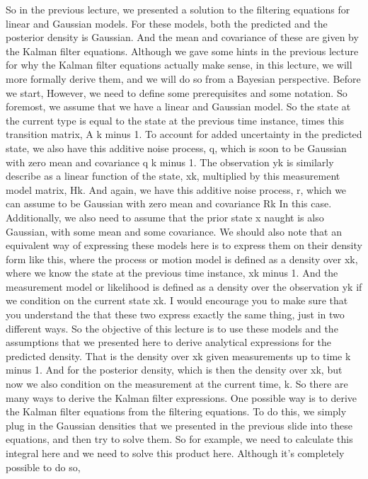 So in the previous lecture, we presented a solution
to the filtering equations for linear and Gaussian models.
For these models, both the predicted
and the posterior density is Gaussian.
And the mean and covariance of these
are given by the Kalman filter equations.
Although we gave some hints in the previous lecture
for why the Kalman filter equations actually make sense,
in this lecture, we will more formally derive them,
and we will do so from a Bayesian perspective.
Before we start,
However, we need to define some prerequisites
and some notation.
So foremost, we assume that we have a linear and Gaussian
model.
So the state at the current type is
equal to the state at the previous time instance,
times this transition matrix, A k minus 1.
To account for added uncertainty in the predicted state,
we also have this additive noise process, q,
which is soon to be Gaussian with zero mean and covariance q
k minus 1.
The observation yk is similarly describe
as a linear function of the state, xk,
multiplied by this measurement model matrix, Hk.
And again, we have this additive noise process,
r, which we can assume to be Gaussian with zero mean
and covariance Rk In this case.
Additionally, we also need to assume that the prior state x
naught is also Gaussian, with some mean and some covariance.
We should also note that an equivalent
way of expressing these models here
is to express them on their density form
like this, where the process or motion model is defined
as a density over xk, where we know
the state at the previous time instance, xk minus 1.
And the measurement model or likelihood
is defined as a density over the observation yk
if we condition on the current state xk.
I would encourage you to make sure that you understand the
that these two express exactly the same thing, just
in two different ways.
So the objective of this lecture is
to use these models and the assumptions
that we presented here to derive analytical expressions
for the predicted density.
That is the density over xk given measurements up
to time k minus 1.
And for the posterior density, which
is then the density over xk, but now we also
condition on the measurement at the current time, k.
So there are many ways to derive the Kalman filter expressions.
One possible way is to derive the Kalman filter equations
from the filtering equations.
To do this, we simply plug in the Gaussian densities
that we presented in the previous slide
into these equations, and then try to solve them.
So for example, we need to calculate this integral here
and we need to solve this product here.
Although it's completely possible to do so,
